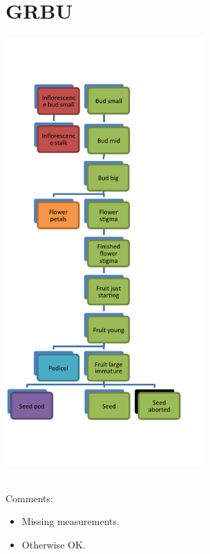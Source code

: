 \documentclass[10pt]{book} %
\begin{document}
\section{GRBU}
\begin{multicols}{2}
\includegraphics[width=3in]{GRBU.png}
\vfill
\columnbreak

\\
Comments:
\begin{itemize}
\item Missing measurements.
\item Otherwise OK.
\end{itemize}

\end{multicols}

\clearpage
\newpage
\end{document}
